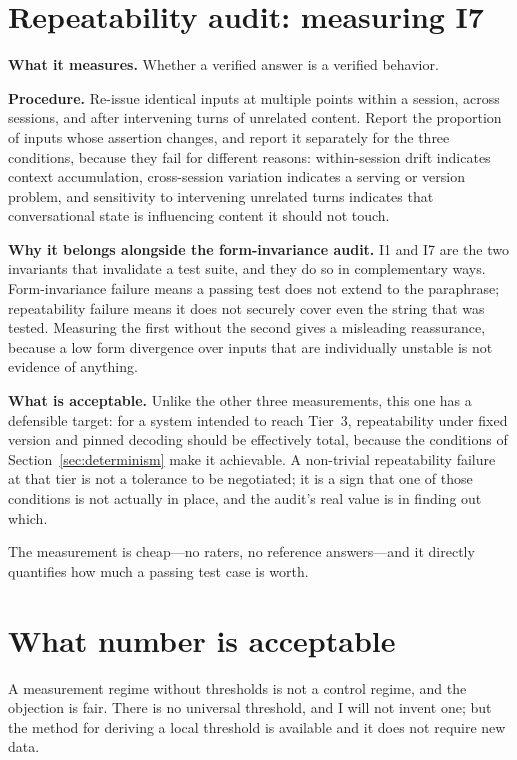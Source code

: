 \section{Repeatability audit: measuring I7}

\textbf{What it measures.} Whether a verified answer is a verified behavior.

\textbf{Procedure.} Re-issue identical inputs at multiple points within a session,
across sessions, and after intervening turns of unrelated content. Report the proportion
of inputs whose assertion changes, and report it separately for the three conditions,
because they fail for different reasons: within-session drift indicates context
accumulation, cross-session variation indicates a serving or version problem, and
sensitivity to intervening unrelated turns indicates that conversational state is
influencing content it should not touch.

\textbf{Why it belongs alongside the form-invariance audit.} I1 and I7 are the two
invariants that invalidate a test suite, and they do so in complementary ways.
Form-invariance failure means a passing test does not extend to the paraphrase;
repeatability failure means it does not securely cover even the string that was tested.
Measuring the first without the second gives a misleading reassurance, because a low form
divergence over inputs that are individually unstable is not evidence of anything.

\textbf{What is acceptable.} Unlike the other three measurements, this one has a defensible
target: for a system intended to reach Tier~3, repeatability under fixed version and
pinned decoding should be effectively total, because the conditions of
Section~\ref{sec:determinism} make it achievable. A non-trivial repeatability failure at
that tier is not a tolerance to be negotiated; it is a sign that one of those conditions is
not actually in place, and the audit's real value is in finding out which.

The measurement is cheap---no raters, no reference answers---and it directly quantifies how much
a passing test case is worth.

\section{What number is acceptable}
\label{sec:thresholds}

A measurement regime without thresholds is not a control regime, and the objection is
fair. There is no universal threshold, and I will not invent one; but the method for
deriving a local threshold is available and it does not require new data.

